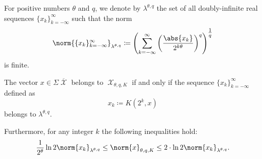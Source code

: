 \begin{definition}\label{def:discrete_k_interpolation_space}
  For positive numbers \( \theta \) and \( q \), we denote by \( \lambda^{\theta,q} \) the set of all doubly-infinite real sequences \( \{ x_k \}_{k=-\infty}^\infty \) such that the norm
  \begin{equation}\label{eq:def:discrete_k_interpolation_space}
    \norm{\{ x_k \}_{k=-\infty}^\infty}_{\lambda^{\theta,q}} \coloneqq \left( \sum_{k=-\infty}^\infty \left( \frac {\abs{x_k}} {2^{k\theta}} \right)^q \right)^{\tfrac 1 q}
  \end{equation}
  is finite.
\end{definition}

\begin{theorem}\label{thm:discrete_k_interpolation}
  The vector \( x \in \Sigma\overline{\mscrX} \) belongs to \hyperref[def:k_functional_interpolation_space]{\( \mscrX_{\theta,q,K} \)} if and only if the sequence \( \{ x_k \}_{k=-\infty}^\infty \) defined as
  \begin{equation}\label{eq:thm:discrete_k_interpolation/sequence}
    x_k \coloneqq K(2^k, x)
  \end{equation}
  belongs to \hyperref[def:discrete_k_interpolation_space]{\( \lambda^{\theta,q} \)}.

  Furthermore, for any integer \( k \) the following inequalities hold:
  \begin{equation}\label{eq:thm:discrete_k_interpolation/inequalities}
    \frac 1 {2^\theta} \ln 2 \norm{x_k}_{\lambda^{\theta,q}}
    \leq
    \norm{x}_{\theta,q,K}
    \leq
    2 \cdot \ln 2 \norm{x_k}_{\lambda^{\theta,q}}.
  \end{equation}
\end{theorem}
